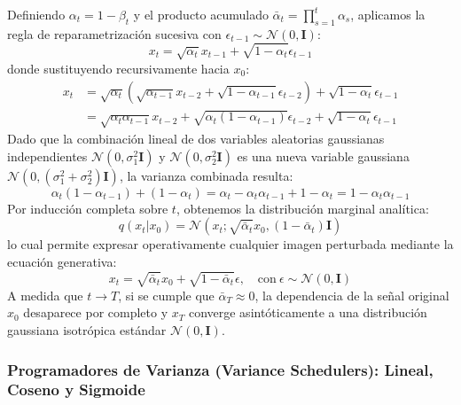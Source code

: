 Definiendo $\alpha_t = 1 - \beta_t$ y el producto acumulado $\bar{\alpha}_t = \prod_{s=1}^t \alpha_s$, aplicamos la regla de reparametrización sucesiva con $\epsilon_{t-1} \sim \mathcal{N}(0, \mathbf{I})$:
\begin{equation}
x_t = \sqrt{\alpha_t} x_{t-1} + \sqrt{1 - \alpha_t} \epsilon_{t-1}
\end{equation}
donde sustituyendo recursivamente hacia $x_0$:
\begin{align}
x_t &= \sqrt{\alpha_t} \left( \sqrt{\alpha_{t-1}} x_{t-2} + \sqrt{1 - \alpha_{t-1}} \epsilon_{t-2} \right) + \sqrt{1 - \alpha_t} \epsilon_{t-1} \nonumber \\
    &= \sqrt{\alpha_t \alpha_{t-1}} x_{t-2} + \sqrt{\alpha_t (1 - \alpha_{t-1})} \epsilon_{t-2} + \sqrt{1 - \alpha_t} \epsilon_{t-1}
\end{align}
Dado que la combinación lineal de dos variables aleatorias gaussianas independientes $\mathcal{N}(0, \sigma_1^2 \mathbf{I})$ y $\mathcal{N}(0, \sigma_2^2 \mathbf{I})$ es una nueva variable gaussiana $\mathcal{N}(0, (\sigma_1^2 + \sigma_2^2)\mathbf{I})$, la varianza combinada resulta:
\begin{equation}
\alpha_t (1 - \alpha_{t-1}) + (1 - \alpha_t) = \alpha_t - \alpha_t \alpha_{t-1} + 1 - \alpha_t = 1 - \alpha_t \alpha_{t-1}
\end{equation}
Por inducción completa sobre $t$, obtenemos la distribución marginal analítica:
\begin{equation}
q(x_t | x_0) = \mathcal{N}\left( x_t; \sqrt{\bar{\alpha}_t} x_0, (1 - \bar{\alpha}_t) \mathbf{I} \right)
\end{equation}
lo cual permite expresar operativamente cualquier imagen perturbada mediante la ecuación generativa:
\begin{equation}
x_t = \sqrt{\bar{\alpha}_t} x_0 + \sqrt{1 - \bar{\alpha}_t} \epsilon, \quad \mathrm{con\ } \epsilon \sim \mathcal{N}(0, \mathbf{I})
\end{equation}
A medida que $t \to T$, si se cumple que $\bar{\alpha}_T \approx 0$, la dependencia de la señal original $x_0$ desaparece por completo y $x_T$ converge asintóticamente a una distribución gaussiana isotrópica estándar $\mathcal{N}(0, \mathbf{I})$.

\subsubsection{Programadores de Varianza (Variance Schedulers): Lineal, Coseno y Sigmoide}


